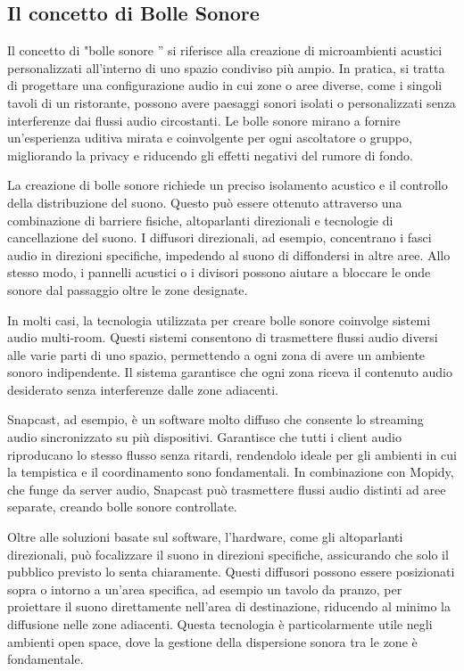 \subsection{Il concetto di Bolle Sonore}
\noindent

Il concetto di "bolle sonore ” si riferisce alla creazione di microambienti acustici personalizzati all'interno di uno spazio condiviso più ampio. In pratica, si tratta di progettare una configurazione audio in cui zone o aree diverse, come i singoli tavoli di un ristorante, possono avere paesaggi sonori isolati o personalizzati senza interferenze dai flussi audio circostanti. Le bolle sonore mirano a fornire un'esperienza uditiva mirata e coinvolgente per ogni ascoltatore o gruppo, migliorando la privacy e riducendo gli effetti negativi del rumore di fondo.

La creazione di bolle sonore richiede un preciso isolamento acustico e il controllo della distribuzione del suono. Questo può essere ottenuto attraverso una combinazione di barriere fisiche, altoparlanti direzionali e tecnologie di cancellazione del suono. I diffusori direzionali, ad esempio, concentrano i fasci audio in direzioni specifiche, impedendo al suono di diffondersi in altre aree. Allo stesso modo, i pannelli acustici o i divisori possono aiutare a bloccare le onde sonore dal passaggio oltre le zone designate.

In molti casi, la tecnologia utilizzata per creare bolle sonore coinvolge sistemi audio multi-room. Questi sistemi consentono di trasmettere flussi audio diversi alle varie parti di uno spazio, permettendo a ogni zona di avere un ambiente sonoro indipendente. Il sistema garantisce che ogni zona riceva il contenuto audio desiderato senza interferenze dalle zone adiacenti.

Snapcast, ad esempio, è un software molto diffuso che consente lo streaming audio sincronizzato su più dispositivi. Garantisce che tutti i client audio riproducano lo stesso flusso senza ritardi, rendendolo ideale per gli ambienti in cui la tempistica e il coordinamento sono fondamentali. In combinazione con Mopidy, che funge da server audio, Snapcast può trasmettere flussi audio distinti ad aree separate, creando bolle sonore controllate.

Oltre alle soluzioni basate sul software, l'hardware, come gli altoparlanti direzionali, può focalizzare il suono in direzioni specifiche, assicurando che solo il pubblico previsto lo senta chiaramente. Questi diffusori possono essere posizionati sopra o intorno a un'area specifica, ad esempio un tavolo da pranzo, per proiettare il suono direttamente nell'area di destinazione, riducendo al minimo la diffusione nelle zone adiacenti. Questa tecnologia è particolarmente utile negli ambienti open space, dove la gestione della dispersione sonora tra le zone è fondamentale.

